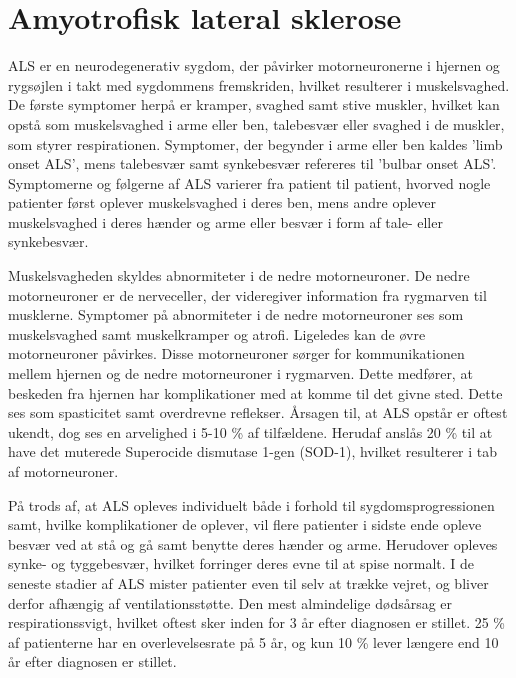 \section{Amyotrofisk lateral sklerose}
ALS er en neurodegenerativ sygdom, der påvirker motorneuronerne i hjernen og rygsøjlen i takt med sygdommens fremskriden, hvilket resulterer i muskelsvaghed. De første symptomer herpå er kramper, svaghed samt stive muskler, hvilket kan opstå som muskelsvaghed i arme eller ben, talebesvær eller svaghed i de muskler, som styrer respirationen. Symptomer, der begynder i arme eller ben kaldes 'limb onset ALS', mens talebesvær samt synkebesvær refereres til 'bulbar onset ALS'. 
Symptomerne og følgerne af ALS varierer fra patient til patient, hvorved nogle patienter først oplever muskelsvaghed i deres ben, mens andre oplever muskelsvaghed i deres hænder og arme eller besvær i form af tale- eller synkebesvær. \citep{miller2005} \citep{nationalinstitute2016}
 
Muskelsvagheden skyldes abnormiteter i de nedre motorneuroner. De nedre motorneuroner er de nerveceller, der videregiver information fra rygmarven til musklerne. Symptomer på abnormiteter i de nedre motorneuroner ses som muskelsvaghed samt muskelkramper og atrofi.
Ligeledes kan de øvre motorneuroner påvirkes. Disse motorneuroner sørger for kommunikationen mellem hjernen og de nedre motorneuroner i rygmarven. Dette medfører, at beskeden fra hjernen har komplikationer med at komme til det givne sted. Dette ses som spasticitet samt overdrevne reflekser.\citep{nationalinstitute2016}
Årsagen til, at ALS opstår er oftest ukendt, dog ses en arvelighed i 5-10 \% af tilfældene. Herudaf anslås 20 \% til at have det muterede Superocide dismutase 1-gen (SOD-1), hvilket resulterer i tab af motorneuroner. \citep{miller2005}

På trods af, at ALS opleves individuelt både i forhold til sygdomsprogressionen samt, hvilke komplikationer de oplever, vil flere patienter i sidste ende opleve besvær ved at stå og gå samt benytte deres hænder og arme. Herudover opleves synke- og tyggebesvær, hvilket forringer deres evne til at spise normalt. I de seneste stadier af ALS mister patienter even til selv at trække vejret, og bliver derfor afhængig af ventilationsstøtte. Den mest almindelige dødsårsag er respirationssvigt, hvilket oftest sker inden for 3 år efter diagnosen er stillet. 25 \% af patienterne har en overlevelsesrate på 5 år, og kun 10 \% lever længere end 10 år efter diagnosen er stillet. \citep{grehl2011} \citep{miller2005}

